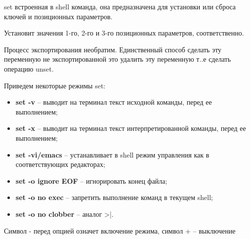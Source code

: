 \begin{defi}{set}
	встроенная в shell команда, она предназначена для установки или сброса ключей и позиционных параметров.
\end{defi}

Установит значения 1-го, 2-го и 3-го позиционных параметров, соответственно.

Процесс экспортирования необратим. Единственный способ сделать эту переменную не экспортированной это удалить эту переменную т..е сделать операцию unset.

Приведем некоторые режимы set:
\begin{itemize}
	\item \textbf{set -v} -- выводит на терминал текст исходной команды, перед ее выполнением;
	\item \textbf{set -x} -- выводит на терминал текст интерпретированной команды, перед ее выполнением;
	\item \textbf{set -vi/emacs} -- устанавливает в shell режим управления как в соответствующих редакторах;
	\item \textbf{set -o ignore EOF} -- игнорировать конец файла;
	\item \textbf{set -o no exec} -- запретить выполнение команд в текущем shell;
	\item \textbf{set -o no clobber} -- аналог >|.
\end{itemize}

\begin{important}
	Символ - перед опцией означет включение режима, символ + -- выключение
\end{important}